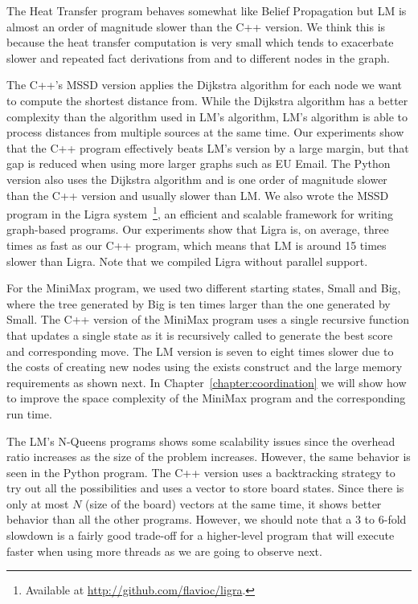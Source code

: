 The Heat Transfer program behaves somewhat like Belief Propagation but LM is
almost an order of magnitude slower than the C++ version. We think this is
because the heat transfer computation is very small which tends to exacerbate
slower and repeated fact derivations from and to different nodes in the graph.

The C++'s MSSD version applies the Dijkstra algorithm for each node we want to
compute the shortest distance from. While the Dijkstra algorithm has a better
complexity than the algorithm used in LM's algorithm, LM's algorithm is able to
process distances from multiple sources at the same time. Our experiments show
that the C++ program effectively beats LM's version by a large margin, but that
gap is reduced when using more larger graphs such as EU Email. The Python
version also uses the Dijkstra algorithm and is one order of magnitude slower
than the C++ version and usually slower than LM. We also wrote the MSSD program
in the Ligra system~\cite{Shun:2013:LLG:2517327.2442530}\footnote{Available at
   \url{http://github.com/flavioc/ligra}.}, an efficient and scalable framework
   for writing graph-based programs. Our experiments show that Ligra is, on
   average, three times as fast as our C++ program, which means that LM is
   around 15 times slower than Ligra. Note that we compiled Ligra without
   parallel support.

For the MiniMax program, we used two different starting states, Small and Big,
where the tree generated by Big is ten times larger than the one generated by
Small. The C++ version of the MiniMax program uses a single recursive function
that updates a single state as it is recursively called to generate the best
score and corresponding move. The LM version is seven to eight times slower due
to the costs of creating new nodes using the exists construct and the large
memory requirements as shown next. In Chapter~\ref{chapter:coordination} we will
show how to improve the space complexity of the MiniMax program and the
corresponding run time.

The LM's N-Queens programs shows some scalability issues since the overhead
ratio increases as the size of the problem increases. However, the same behavior
is seen in the Python program. The C++ version uses a backtracking strategy to
try out all the possibilities and uses a vector to store board states.  Since
there is only at most $N$ (size of the board) vectors at the same time, it shows
better behavior than all the other programs. However, we should note that a 3 to
6-fold slowdown is a fairly good trade-off for a higher-level program that will
execute faster when using more threads as we are going to observe next.


